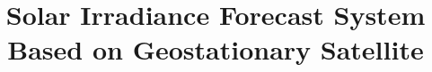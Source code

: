 \documentclass[conference]{IEEEtran}
\begin{document}
%
\title{Solar Irradiance Forecast System Based on Geostationary Satellite}
%
%
\end{document}

